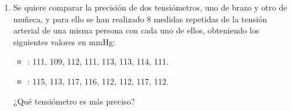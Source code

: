 \begin{enumerate}[leftmargin=*]
\item Se quiere comparar la precisión de dos tensiómetros, uno de brazo y otro de muñeca, y para ello se han realizado 8
medidas repetidas de la tensión arterial de una misma persona con cada uno de ellos, obteniendo los siguientes valores
en mmHg:
\begin{itemize}
\item {}: 111, 109, 112, 111, 113, 113, 114, 111.
\item {}: 115, 113, 117, 116, 112, 112, 117, 112.
\end{itemize}
¿Qué tensiómetro es más preciso?
\end{enumerate}
